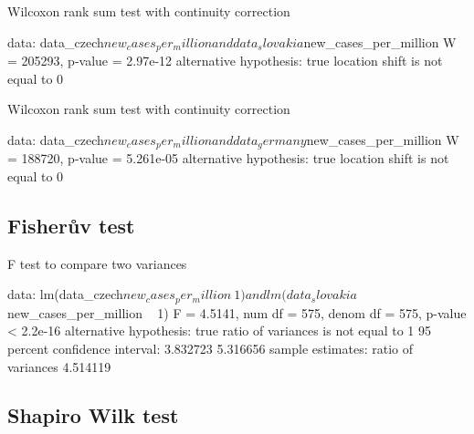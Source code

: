 \documentclass[a4paper, 12pt]{article}
\begin{document}
\begin{Schunk}
\begin{Soutput}
	Wilcoxon rank sum test with continuity correction

data:  data_czech$new_cases_per_million and data_slovakia$new_cases_per_million
W = 205293, p-value = 2.97e-12
alternative hypothesis: true location shift is not equal to 0
\end{Soutput}
\end{Schunk}

\begin{Schunk}
\begin{Soutput}
	Wilcoxon rank sum test with continuity correction

data:  data_czech$new_cases_per_million and data_germany$new_cases_per_million
W = 188720, p-value = 5.261e-05
alternative hypothesis: true location shift is not equal to 0
\end{Soutput}
\end{Schunk}

\clearpage

\subsection{Fisherův test}

\begin{Schunk}
\begin{Soutput}
	F test to compare two variances

data:  lm(data_czech$new_cases_per_million ~ 1) and lm(data_slovakia$new_cases_per_million ~ 1)
F = 4.5141, num df = 575, denom df = 575, p-value < 2.2e-16
alternative hypothesis: true ratio of variances is not equal to 1
95 percent confidence interval:
 3.832723 5.316656
sample estimates:
ratio of variances 
          4.514119 
\end{Soutput}
\end{Schunk}

\subsection{Shapiro Wilk test}

\begin{Schunk}
\end{Schunk}
\end{document}

